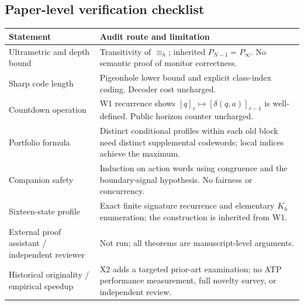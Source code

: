 \documentclass[11pt,letterpaper]{article}
\begin{document}
\subsection*{Paper-level verification checklist}
\begin{center}\small
\begin{tabularx}{\textwidth}{@{}p{37mm}X@{}}\toprule
Statement & Audit route and limitation\\\midrule
Ultrametric and depth bound & Transitivity of $\equiv_h$; inherited $P_{N-1}=P_\infty$. No semantic proof of monitor correctness.\\
Sharp code length & Pigeonhole lower bound and explicit class-index coding. Decoder cost uncharged.\\
Countdown operation & W1 recurrence shows $[q]_r\mapsto[\delta(q,a)]_{r-1}$ is well-defined. Public horizon counter uncharged.\\
Portfolio formula & Distinct conditional profiles within each old block need distinct supplemental codewords; local indices achieve the maximum.\\
Companion safety & Induction on action words using congruence and the boundary-signal hypothesis. No fairness or concurrency.\\
Sixteen-state profile & Exact finite signature recurrence and elementary $K_h$ enumeration; the construction is inherited from W1.\\
External proof assistant / independent reviewer & Not run; all theorems are manuscript-level arguments.\\
Historical originality / empirical speedup & X2 adds a targeted prior-art examination; no ATP performance measurement, full novelty survey, or independent review.\\\bottomrule
\end{tabularx}
\end{center}
\end{document}
